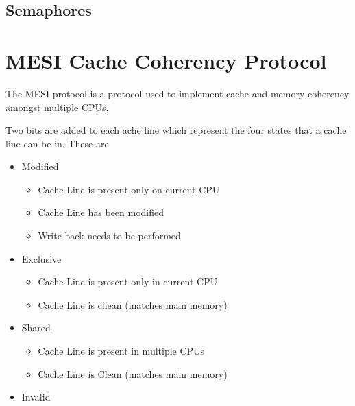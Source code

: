 \documentclass{article}
\begin{document}
  



\subsection{Semaphores}


\section{MESI Cache Coherency Protocol}

The MESI protocol is a protocol used to implement cache and memory coherency amongst multiple CPUs. \cite{Birdetal2001}

Two bits are added to each ache line which represent the four states that a cache line can be in. These are

\begin{itemize}
\item Modified
  \begin{itemize}
    \item Cache Line is present only on current CPU
    \item Cache Line has been modified
    \item Write back needs to be performed
  \end{itemize}


\item Exclusive
    \begin{itemize}
    \item Cache Line is present only in current CPU
    \item Cache Line is cliean (matches main memory)
    \end{itemize}
    
  \item Shared
    \begin{itemize}
    \item Cache Line is present in multiple CPUs
    \item Cache Line is Clean (matches main memory)
    \end{itemize}
  \item Invalid 
\end{itemize}
\end{document}
